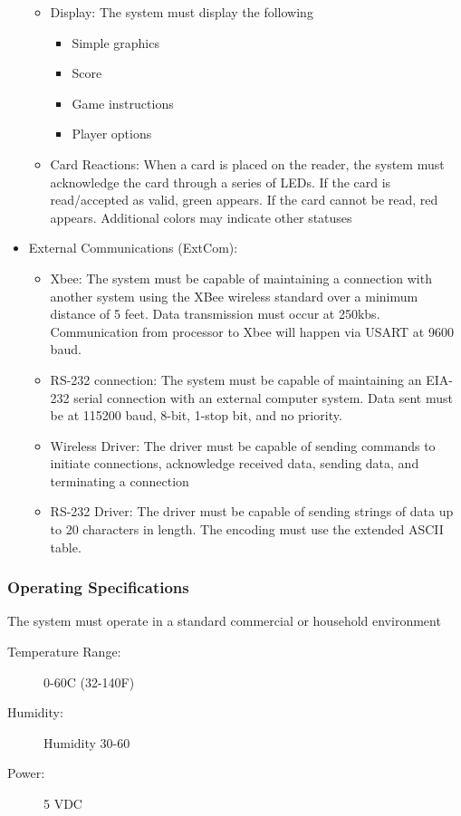 \documentclass[12pt]{article} %
\begin{document}
\begin{itemize}
\begin{itemize}
			\item Display: The system must display the following
				\begin{itemize}		
					\item Simple graphics
					\item Score
					\item Game instructions
					\item Player options
				\end{itemize}
			\item Card Reactions: When a card is placed on the reader, the system must acknowledge the card through a series of LEDs. If the card is read/accepted as valid, green appears. If the card cannot be read, red appears. Additional colors may indicate other statuses
		\end{itemize}	
	\item External Communications (ExtCom): 
		\begin{itemize}
			\item Xbee: The system must be capable of maintaining a connection with another system using the XBee wireless standard over a minimum distance of 5 feet. Data transmission must occur at 250kbs. Communication from processor to Xbee will happen via USART at 9600 baud. 
			\item RS-232 connection: The system must be capable of maintaining an EIA-232 serial connection with an external computer system. Data sent must be at 115200 baud, 8-bit, 1-stop bit, and no priority.
			\item Wireless Driver: The driver must be capable of sending commands to initiate connections, acknowledge received data, sending data, and terminating a connection
			\item RS-232 Driver: The driver must be capable of sending strings of data up to 20 characters in length. The encoding must use the extended ASCII table.
		\end{itemize}
\end{itemize}

\subsubsection{Operating Specifications}\label{opSpec}

The system must operate in a standard commercial or household environment

\begin{description}
	\item[Temperature Range:] 0-60C (32-140F)
	\item[Humidity:] Humidity 30-60%
	\item[Power:] 5 VDC
\end{description}
 
\end{document}
